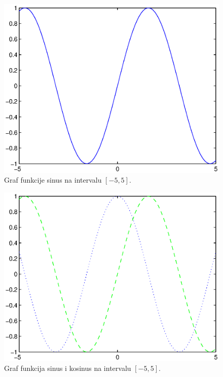 \documentclass[a4paper, 10pt]{article}
\begin{document}
\begin{figure}[!htb]
\centering
\includegraphics[width=0.95\linewidth]{slike/plot_sin_1.eps}
\caption{Graf funkcije sinus na intervalu $[-5, 5]$.}
\label{fig:plot_sin_1}
\end{figure}

\begin{figure}[!htb]
\centering
\includegraphics[width=0.95\linewidth]{slike/plot_sin_cos_1.eps}
\caption{Graf funkcija sinus i kosinus na intervalu $[-5, 5]$.}
\label{fig:plot_sin_cos_1}
\end{figure}
\end{document}
